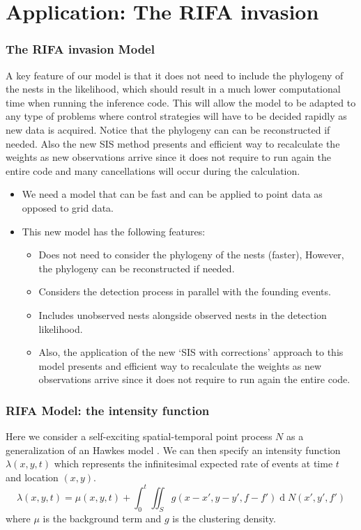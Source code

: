 \documentclass[9pt, xcolor={dvipsnames,svgnames,table}]{beamer}
\renewcommand{\d}[1]{\ensuremath{\operatorname{d}\!{#1}}}
\begin{document}
\section{Application: The RIFA invasion}

\begin{frame}
\frametitle{The RIFA invasion Model}
A key feature of our model is that it does not need to include the phylogeny of the nests in the likelihood, which should result in a much lower computational time when running the inference code. This will allow the model to be adapted to any type of problems where control strategies will have to be decided rapidly as new data is acquired. Notice that the phylogeny can can be reconstructed if needed. Also the new SIS method presents and efficient way to recalculate the weights as new observations arrive since it does not require to run again the entire code and many cancellations will occur during the calculation. 


\begin{itemize}
\item We need a model that can be fast and can be applied to point data as opposed to grid data.
\item This new model has the following features:
    \begin{itemize}
        \item Does not need to consider the phylogeny of the nests (faster), However, the phylogeny can be reconstructed if needed.
        \item Considers the detection process in parallel with the founding events.
        \item Includes unobserved nests alongside observed nests in the detection likelihood.
        \item Also, the application of the new `SIS with corrections' approach to this model presents and efficient way to recalculate the weights as new observations arrive since it does not require to run again the entire code.
    \end{itemize}
\end{itemize}
\end{frame}



\begin{frame}
\frametitle{RIFA Model: the intensity function}
    Here we consider a self-exciting spatial-temporal point process $N$ as a generalization of an Hawkes model \cite{Hawkes71}. We can then specify an intensity function $\lambda(x, y, t)$ which represents the infinitesimal expected  rate of events at time $t$ and location $(x, y)$.
    \begin{equation*}
        \lambda(x, y, t) = \mu(x, y, t) + \int_{0}^{t} \iint_{S} g(x - x', y - y', f - f') \d N(x', y', f')
    \end{equation*}
    where $\mu$ is the background term and $g$ is the clustering density.
\end{frame}
\end{document}
